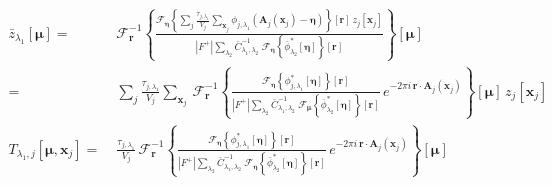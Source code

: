 \documentclass[DM,authoryear,toc]{lsstdoc}
\begin{document}
\begin{align}
    \bar{z}_{\lambda_1}[\bm{\mu}]
    =&\;
    \mathcal{F}^{-1}_{\bm{r}}\!\left\{
        \frac{
            \mathcal{F}_{\bm{\eta}}\!\left\{
            \sum\limits_{j}
            \frac{\tau_{j,\lambda_1}}{V_j}
            \sum\limits_{\bm{x}_j}
            \phi_{j,\lambda_1}\!\left(
                \bm{A}_j(\bm{x}_j) - \bm{\eta}
            \right)
            \right\}\!\left[
                \bm{r}
            \right]
            \,
            z_j[\bm{x}_j]
        }{
            |F^+|
            \sum\limits_{\lambda_2}
            \bar{C}_{\lambda_1,\lambda_2}^{-1}
            \;
            \mathcal{F}_{\bm{\eta}}\!\left\{
                \bar{\phi}^*_{\lambda_2}[\bm{\eta}]
            \right\}\!\left[
                \bm{r}
            \right]
        }
    \right\}\!\left[
        \bm{\mu}
    \right]
    \,
    \\
    =&\;
    \sum_{j}
    \frac{\tau_{j,\lambda_1}}{V_j}
    \sum_{\bm{x}_j}
    \,
    \mathcal{F}^{-1}_{\bm{r}}\!\left\{
        \frac{
            \mathcal{F}_{\bm{\eta}}\!\!\left\{
            \phi^*_{j,\lambda_1}\!\left[
                \bm{\eta}
            \right]
            \right\}\!\left[
                \bm{r}
            \right]
        }{
            |F^+|
            \sum\limits_{\lambda_2}
            \bar{C}_{\lambda_1,\lambda_2}^{-1}
            \;
            \mathcal{F}_{\bm{\mu}}\!\!\left\{
                \bar{\phi}^*_{\lambda_2}[\bm{\eta}]
            \right\}\!\left[
                \bm{r}
            \right]
        }
        \,
        e^{-2\pi i\,\bm{r}\cdot\bm{A}_j(\bm{x}_j)}
    \right\}\!\left[
        \bm{\mu}
    \right]
    \,
    z_j[\bm{x}_j]
    \\
    T_{\lambda_1,j}[\bm{\mu},\bm{x}_j]
    =&\;
    \frac{\tau_{j,\lambda_1}}{V_j}
    \,
    \mathcal{F}^{-1}_{\bm{r}}\!\left\{
        \frac{
            \mathcal{F}_{\bm{\eta}}\!\left\{
            \phi^*_{j,\lambda_1}\!\left[
                \bm{\eta}
            \right]
            \right\}\!\left[
                \bm{r}
            \right]
        }{
            |F^+|
            \sum\limits_{\lambda_2}
            \bar{C}_{\lambda_1,\lambda_2}^{-1}
            \;
            \mathcal{F}_{\bm{\eta}}\!\left\{
                \bar{\phi}^*_{\lambda_2}[\bm{\eta}]
            \right\}\!\left[
                \bm{r}
            \right]
        }
        \,
        e^{-2\pi i\,\bm{r}\cdot\bm{A}_j(\bm{x}_j)}
    \right\}\!\left[
        \bm{\mu}
    \right]
\end{align}
\end{document}
